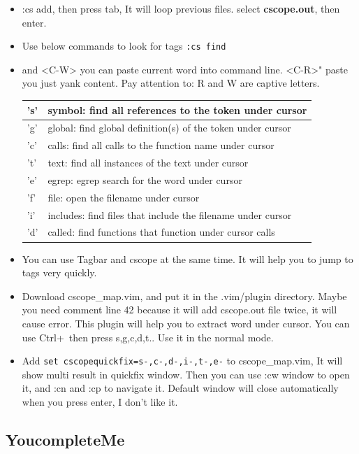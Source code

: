 \documentclass[a4paper,12pt,twoside]{book}
\begin{document}
\begin{itemize}
\begin{itemize}
\item :cs add, then press tab, It will loop previous files. select \textbf{cscope.out}, then enter.

\item Use below commands to look for tags \verb=:cs find= 
\item <C-R> and <C-W> you can paste current word into command line. <C-R>" paste you just yank content. Pay attention to: R and W are captive letters.
  
\begin{tabular}{p{}|p{}}
\hline 
's'  & symbol: find all references to the token under cursor \\
\hline 
'g'  & global: find global definition(s) of the token under cursor \\
\hline 
'c'  & calls:  find all calls to the function name under cursor \\
\hline 
't'  & text:   find all instances of the text under cursor \\
\hline 
'e'  & egrep:  egrep search for the word under cursor \\
\hline 
'f'  & file:   open the filename under cursor \\
\hline 
'i'  & includes: find files that include the filename under cursor \\
\hline 
'd' &  called: find functions that function under cursor calls \\
\hline
\end{tabular}
\item You can use Tagbar and cscope at the same time. It will help you to jump to tags very quickly. 	

\item Download cscope\_map.vim, and put it in the .vim/plugin directory. Maybe you need comment line 42 because it will add cscope.out file twice, it will cause error. This plugin will help you to extract word under cursor. You can use Ctrl+\ then press s,g,c,d,t.. Use it in the normal mode. 

\item Add \verb!set cscopequickfix=s-,c-,d-,i-,t-,e-! to cscope\_map.vim, It will show multi result in quickfix window. Then you can use :cw window to open it, and :cn and :cp to navigate it. Default window will close automatically when you press enter, I don't like it. 
\end{itemize}

\subsection{YoucompleteMe}


\end{itemize}
\end{document}
